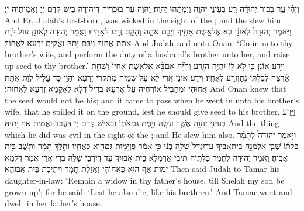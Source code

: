 {וַיְהִ֗י עֵ֚ר בְּכ֣וֹר יְהוּדָ֔ה רַ֖ע בְּעֵינֵ֣י יְהֹוָ֑ה וַיְמִתֵ֖הוּ יְהֹוָֽה׃}
{וַהֲוָה עֵר בּוּכְרֵיהּ דִּיהוּדָה בִּישׁ קֳדָם יְיָ וַאֲמִיתֵיהּ יְיָ׃}
{And Er, Judah’s first-born, was wicked in the sight of the \lord; and the \lord\space slew him.}{}
{וַיֹּ֤אמֶר יְהוּדָה֙ לְאוֹנָ֔ן בֹּ֛א אֶל\maqqaf אֵ֥שֶׁת אָחִ֖יךָ וְיַבֵּ֣ם אֹתָ֑הּ וְהָקֵ֥ם זֶ֖רַע לְאָחִֽיךָ׃}
{וַאֲמַר יְהוּדָה לְאוֹנָן עוֹל לְוָת אִתַּת אֲחוּךְ וְיַבֵּם יָתַהּ וַאֲקֵים זַרְעָא לַאֲחוּךְ׃}
{And Judah said unto Onan: ‘Go in unto thy brother’s wife, and perform the duty of a husband’s brother unto her, and raise up seed to thy brother.’}{}
{וַיֵּ֣דַע אוֹנָ֔ן כִּ֛י לֹּ֥א ל֖וֹ יִהְיֶ֣ה הַזָּ֑רַע וְהָיָ֞ה אִם\maqqaf בָּ֨א אֶל\maqqaf אֵ֤שֶׁת אָחִיו֙ וְשִׁחֵ֣ת אַ֔רְצָה לְבִלְתִּ֥י נְתׇן\maqqaf זֶ֖רַע לְאָחִֽיו׃}
{וִידַע אוֹנָן אֲרֵי לָא עַל שְׁמֵיהּ מִתְקְרֵי זַרְעָא וְהָוֵי כַּד עָלֵיל לְוָת אִתַּת אֲחוּהִי וּמְחַבֵּיל אוֹרְחֵיהּ עַל אַרְעָא בְּדִיל דְּלָא לְאָקָמָא זַרְעָא לַאֲחוּהִי׃}
{And Onan knew that the seed would not be his; and it came to pass when he went in unto his brother’s wife, that he spilled it on the ground, lest he should give seed to his brother.}{}
{וַיֵּ֛רַע בְּעֵינֵ֥י יְהֹוָ֖ה אֲשֶׁ֣ר עָשָׂ֑ה וַיָּ֖מֶת גַּם\maqqaf אֹתֽוֹ׃}
{וּבְאֵישׁ קֳדָם יְיָ דַּעֲבַד וַאֲמִית אַף יָתֵיהּ׃}
{And the thing which he did was evil in the sight of the \lord; and He slew him also.}{}
{וַיֹּ֣אמֶר יְהוּדָה֩ לְתָמָ֨ר כַּלָּת֜וֹ שְׁבִ֧י אַלְמָנָ֣ה בֵית\maqqaf אָבִ֗יךְ עַד\maqqaf יִגְדַּל֙ שֵׁלָ֣ה בְנִ֔י כִּ֣י אָמַ֔ר פֶּן\maqqaf יָמ֥וּת גַּם\maqqaf ה֖וּא כְּאֶחָ֑יו וַתֵּ֣לֶךְ תָּמָ֔ר וַתֵּ֖שֶׁב בֵּ֥ית אָבִֽיהָ׃}
{וַאֲמַר יְהוּדָה לְתָמָר כַּלְּתֵיהּ תִּיבִי אַרְמְלָא בֵּית אֲבוּיִךְ עַד דְּיִרְבֵּי שֵׁלָה בְרִי אֲרֵי אֲמַר דִּלְמָא יְמוּת אַף הוּא כַּאֲחוֹהִי וַאֲזַלַת תָּמָר וִיתֵיבַת בֵּית אֲבוּהָא׃}
{Then said Judah to Tamar his daughter-in-law: ‘Remain a widow in thy father’s house, till Shelah my son be grown up’; for he said: ‘Lest he also die, like his brethren.’ And Tamar went and dwelt in her father’s house.}{}
